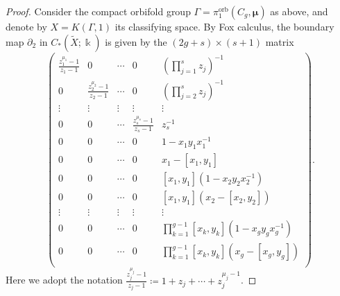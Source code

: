 \documentclass[10pt,a4paper]{amsart}
\DeclareMathOperator{\orb}{orb}
\renewcommand{\k}{\Bbbk}
\begin{document}
\begin{proof}
Consider the compact orbifold group $\Gamma=\pi_1^{\orb}(C_{g},{\bm \mu})$ 
as above, and denote by $X=K(\Gamma,1)$ its classifying space. By Fox calculus, 
the boundary map $\partial_2$ in $C_*(\widetilde{X};\k)$ is given by the 
$(2g+s)\times (s+1)$ matrix 
\[ 
\begin{pmatrix} 
\label{matrix compact} 
\frac{z_{1}^{\mu_{1}}-1}{z_{1}-1} & 0 & \cdots & 0 & (\prod_{j=1}^s z_j)^{-1} \\
0 & \frac{z_{2}^{\mu_{2}}-1}{z_{2}-1} & \cdots & 0 & (\prod_{j=2}^s z_j)^{-1} \\
\vdots & \vdots & \vdots & \vdots & \vdots \\
0 & 0 & \cdots & \frac{z_{s}^{\mu_{s}}-1}{z_{s}-1} &  z_s^{-1} \\
0& 0 & \cdots & 0 & 1-x_1y_1x_1^{-1} \\
0& 0 & \cdots & 0 & x_1-[x_{1},y_{1}] \\
0& 0 & \cdots & 0 & [x_1,y_1] (1-x_2y_2x_2^{-1}) \\
0& 0 & \cdots & 0 & [x_1,y_1] (x_2-[x_{2},y_{2}]) \\
\vdots& \vdots & \vdots & \vdots & \vdots \\
0& 0 & \cdots & 0 & \prod_{k=1}^{g-1}[x_k,y_k] (1-x_g y_g x_g^{-1}) \\
0& 0 & \cdots & 0 & \prod_{k=1}^{g-1}[x_k,y_k] (x_g-[x_{g},y_{g}]) \\
\end{pmatrix}. 
\]
Here we adopt the notation $\frac{z_{j}^{\mu_{j}}-1}{z_{j}-1}\coloneqq 
1+z_j+\cdots+z_j^{\mu_j-1}$.


\end{proof}
\end{document}
